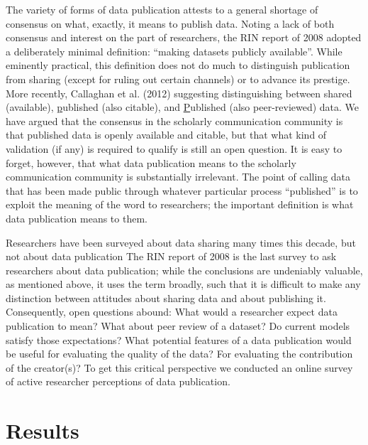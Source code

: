 \documentclass[10pt]{article}
\begin{document}
The variety of forms of data publication attests to a general shortage of consensus on what, exactly, it means to publish data.
Noting a lack of both consensus and interest on the part of researchers, the RIN report of 2008 adopted a deliberately minimal definition: ``making datasets publicly available''\cite{swan_share_2008}.
While eminently practical, this definition does not do much to distinguish publication from sharing (except for ruling out certain channels) or to advance its prestige.
More recently, Callaghan et al. (2012) suggesting distinguishing between shared (available), \underline{p}ublished (also citable), and \underline{P}ublished (also peer-reviewed) data\cite{callaghan_making_2012}.
We have argued that the consensus in the scholarly communication community is that published data is openly available and citable, but that what kind of validation (if any) is required to qualify is still an open question\cite{kratz_data_2014}.
It is easy to forget, however, that what data publication means to the scholarly communication community is substantially irrelevant.
The point of calling data that has been made public through whatever particular process ``published'' is to exploit the meaning of the word to researchers; the important definition is what data publication means to them. 

Researchers have been surveyed about data sharing many times this decade, but not about data publication\cite{harley_assessing_2010, westra_data_2010, tenopir_data_2011, kim_institutional_2012, scaramozzino_study_2012, williams_gathering_2013, bobrow_establishing_2014, strasser_dataup:_2014}
The RIN report of 2008 is the last survey to ask researchers about data publication; while the conclusions are undeniably valuable, as mentioned above, it uses the term broadly, such that it is difficult to make any distinction between attitudes about sharing data and about publishing it\cite{swan_share_2008}.
Consequently, open questions abound:
What would a researcher expect data publication to mean?
What about peer review of a dataset?
Do current models satisfy those expectations?
What potential features of a data publication would be useful for evaluating the quality of the data?
For evaluating the contribution of the creator(s)?
To get this critical perspective we conducted an online survey of active researcher perceptions of data publication.


\section*{Results}
\end{document}
